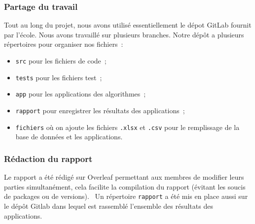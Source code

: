 \documentclass[12pt]{article}
\begin{document}
    \subsubsection{Partage du travail}
    Tout au long du projet, nous avons utilisé essentiellement le dépot \textsf{GitLab} fournit par l'école. Nous avons travaillé sur plusieurs branches. Notre dépôt a plusieurs répertoires pour organiser nos fichiers~:
    \begin{itemize}[label=\textbullet]
    \item \texttt{src} pour les fichiers de code~;
    \item \texttt{tests} pour les fichiers test~;
    \item \texttt{app} pour les applications des algorithmes~;
    \item \texttt{rapport} pour enregistrer les résultats des applications~;
    \item \texttt{fichiers} où on ajoute les fichiers \texttt{.xlsx} et \texttt{.csv} pour le remplissage de la base de données et les applications.
    \end{itemize}

    \subsubsection{Rédaction du rapport}
    Le rapport a été rédigé sur \textsf{Overleaf} permettant aux membres de modifier leurs parties simultanément, cela facilite la compilation du rapport (évitant les soucis de packages ou de versions). \ 
    Un répertoire \texttt{rapport} a été mis en place aussi sur le dépôt \textsf{Gitlab} dans lequel est rassemblé l'ensemble des résultats des applications.
\end{document}
